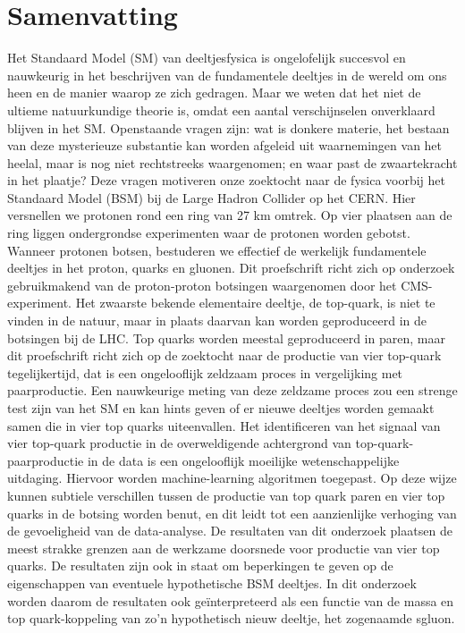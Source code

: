 \chapter*{Samenvatting}
\footnotesize{ Het Standaard Model (SM) van deeltjesfysica is ongelofelijk succesvol en nauwkeurig in het beschrijven van de fundamentele deeltjes in de wereld om ons heen en de manier waarop ze zich gedragen. Maar we weten dat het niet de ultieme natuurkundige theorie is, omdat een aantal verschijnselen onverklaard blijven in het SM. Openstaande vragen zijn: wat is donkere materie, het bestaan van deze mysterieuze substantie kan worden afgeleid uit waarnemingen van het heelal, maar is nog niet rechtstreeks waargenomen; en waar past de zwaartekracht in het plaatje? Deze vragen motiveren onze zoektocht naar de fysica voorbij het Standaard Model (BSM) bij de Large Hadron Collider op het CERN. Hier versnellen we protonen rond een ring van 27 km omtrek. Op vier plaatsen aan de ring liggen ondergrondse experimenten waar de protonen worden gebotst. Wanneer protonen botsen, bestuderen we effectief de werkelijk fundamentele deeltjes in het proton, quarks en gluonen. 
Dit proefschrift richt zich op onderzoek gebruikmakend van de proton-proton botsingen waargenomen door het CMS-experiment. Het zwaarste bekende elementaire deeltje, de top-quark, is niet te vinden in de natuur, maar in plaats daarvan kan worden geproduceerd in de botsingen bij de LHC. Top quarks worden meestal geproduceerd in paren, maar dit proefschrift richt zich op de zoektocht naar de productie van vier top-quark tegelijkertijd, dat is een ongelooflijk zeldzaam proces in vergelijking met paarproductie. Een nauwkeurige meting van deze zeldzame proces zou een strenge test zijn van het SM en kan hints geven of er nieuwe deeltjes worden gemaakt samen die in vier top quarks uiteenvallen. Het identificeren van het signaal van vier top-quark productie in de overweldigende achtergrond van top-quark-paarproductie in de data is een ongelooflijk moeilijke wetenschappelijke uitdaging. Hiervoor worden machine-learning algoritmen toegepast. Op deze wijze kunnen subtiele verschillen tussen de productie van top quark paren en vier top quarks in de botsing worden benut, en dit leidt tot een aanzienlijke verhoging van de gevoeligheid van de data-analyse. 
De resultaten van dit onderzoek plaatsen de meest strakke grenzen aan de werkzame doorsnede voor productie van vier top quarks. De resultaten zijn ook in staat om beperkingen te geven op de eigenschappen van eventuele hypothetische BSM deeltjes. In dit onderzoek worden daarom de resultaten ook ge{\"i}nterpreteerd als een functie van de massa en top quark-koppeling van zo'n hypothetisch nieuw deeltje, het zogenaamde sgluon.}

\normalsize
